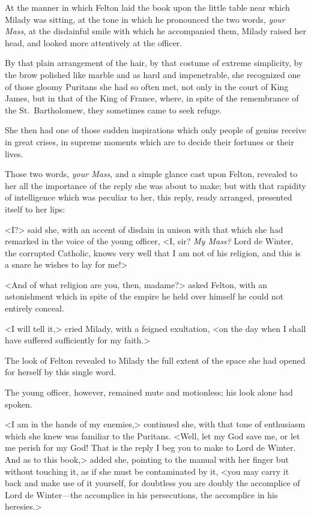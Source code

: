 At the manner in which Felton laid the book upon the little table near which Milady was sitting, at the tone in which he pronounced the two words, \emph{your Mass}, at the disdainful smile with which he accompanied them, Milady raised her head, and looked more attentively at the officer. 

By that plain arrangement of the hair, by that costume of extreme simplicity, by the brow polished like marble and as hard and impenetrable, she recognized one of those gloomy Puritans she had so often met, not only in the court of King James, but in that of the King of France, where, in spite of the remembrance of the St.~Bartholomew, they sometimes came to seek refuge. 

She then had one of those sudden inspirations which only people of genius receive in great crises, in supreme moments which are to decide their fortunes or their lives. 

Those two words, \emph{your Mass}, and a simple glance cast upon Felton, revealed to her all the importance of the reply she was about to make; but with that rapidity of intelligence which was peculiar to her, this reply, ready arranged, presented itself to her lips: 

<I?> said she, with an accent of disdain in unison with that which she had remarked in the voice of the young officer, <I, sir? \emph{My Mass?} Lord de Winter, the corrupted Catholic, knows very well that I am not of his religion, and this is a snare he wishes to lay for me!> 

<And of what religion are you, then, madame?> asked Felton, with an astonishment which in spite of the empire he held over himself he could not entirely conceal. 

<I will tell it,> cried Milady, with a feigned exultation, <on the day when I shall have suffered sufficiently for my faith.> 

The look of Felton revealed to Milady the full extent of the space she had opened for herself by this single word. 

The young officer, however, remained mute and motionless; his look alone had spoken. 

<I am in the hands of my enemies,> continued she, with that tone of enthusiasm which she knew was familiar to the Puritans. <Well, let my God save me, or let me perish for my God! That is the reply I beg you to make to Lord de Winter. And as to this book,> added she, pointing to the manual with her finger but without touching it, as if she must be contaminated by it, <you may carry it back and make use of it yourself, for doubtless you are doubly the accomplice of Lord de Winter—the accomplice in his persecutions, the accomplice in his heresies.> 

